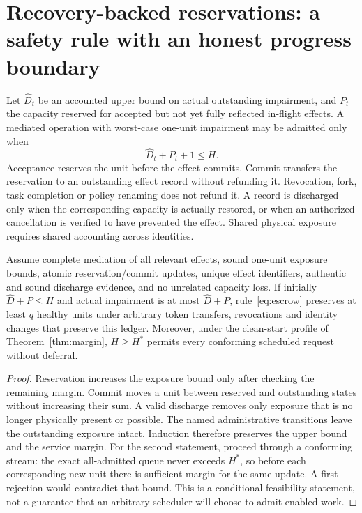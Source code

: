 \section{Recovery-backed reservations: a safety rule with an honest progress boundary}
\label{sec:escrow}
Let $\widehat D_t$ be an accounted upper bound on actual outstanding impairment, and $P_t$ the capacity reserved for accepted but not yet fully reflected in-flight effects. A mediated operation with worst-case one-unit impairment may be admitted only when
\begin{equation}
 \widehat D_t+P_t+1\le H.
 \label{eq:escrow}
\end{equation}
Acceptance reserves the unit before the effect commits. Commit transfers the reservation to an outstanding effect record without refunding it. Revocation, fork, task completion or policy renaming does not refund it. A record is discharged only when the corresponding capacity is actually restored, or when an authorized cancellation is verified to have prevented the effect. Shared physical exposure requires shared accounting across identities.

\begin{theorem}
\label{thm:escrow}
Assume complete mediation of all relevant effects, sound one-unit exposure bounds, atomic reservation/commit updates, unique effect identifiers, authentic and sound discharge evidence, and no unrelated capacity loss. If initially $\widehat D+P\le H$ and actual impairment is at most $\widehat D+P$, rule~\eqref{eq:escrow} preserves at least $q$ healthy units under arbitrary token transfers, revocations and identity changes that preserve this ledger. Moreover, under the clean-start profile of Theorem~\ref{thm:margin}, $H\ge H^*$ permits every conforming scheduled request without deferral.
\end{theorem}
\begin{proof}
Reservation increases the exposure bound only after checking the remaining margin. Commit moves a unit between reserved and outstanding states without increasing their sum. A valid discharge removes only exposure that is no longer physically present or possible. The named administrative transitions leave the outstanding exposure intact. Induction therefore preserves the upper bound and the service margin. For the second statement, proceed through a conforming stream: the exact all-admitted queue never exceeds $H^*$, so before each corresponding new unit there is sufficient margin for the same update. A first rejection would contradict that bound. This is a conditional feasibility statement, not a guarantee that an arbitrary scheduler will choose to admit enabled work.
\end{proof}

